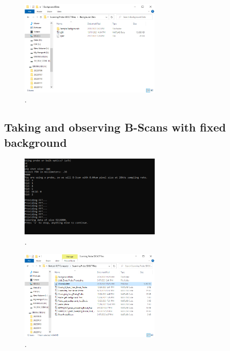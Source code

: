 \documentclass{article}
\begin{document}
\par{}

\begin{figure}[!h]
	\centering
	\includegraphics[width=0.6\textwidth]{Data for Probe Writeup/spec location.png}
	\caption{.}
\end{figure}

\subsection{Taking and observing B-Scans with fixed background}

\par{}

\begin{figure}[!h]
	\centering
	\includegraphics[width=0.6\textwidth]{Data for Probe Writeup/BMode Probe.png}
	\caption{.}
\end{figure}

\begin{figure}[!h]
	\centering
	\includegraphics[width=0.6\textwidth]{Data for Probe Writeup/BScan location.png}
	\caption{.}
\end{figure}
\end{document}
